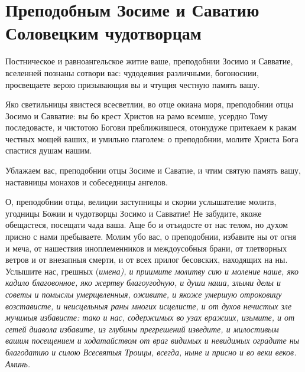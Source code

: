 \section{Преподобным Зосиме и Саватию Соловецким чудотворцам}\begin{mymulticols}
 


Постническое и равноангельское житие ваше, преподобнии Зосимо и Савватие, вселенней познаны сотвори вас: чудодеяния различными, богоноснии, просвещаете верою призывающия вы и чтущия честную память вашу.


Яко светильницы явистеся всесветлии, во отце окиана моря, преподобнии отцы Зосимо и Савватие: вы бо крест Христов на рамо всемше, усердно Тому последовасте, и чистотою Богови преближившеся, отонудуже притекаем к ракам честных мощей ваших, и умильно глаголем: о преподобнии, молите Христа Бога спастися душам нашим.


Ублажаем вас, преподобнии отцы Зосиме и Саватие, и чтим святую память вашу, наставницы монахов и собеседницы ангелов.


О, преподобнии отцы, велиции заступницы и скории услышателие молитв, угодницы Божии и чудотворцы Зосимо и Савватие! Не забудите, якоже обещастеся, посещати чада ваша. Аще бо и отъидосте от нас телом, но духом присно с нами пребываете. Молим убо вас, о преподобнии, избавите ны от огня и меча, от нашествия иноплеменников и междоусобныя брани, от тлетворных ветров и от внезапныя смерти, и от всех прилог бесовских, находящих на ны. Услышите нас, грешных (\itshape имена\normalfont{}), и приимите молитву сию и моление наше, яко кадило благовонное, яко жертву благоугодную, и души наша, злыми делы и советы и помыслы умерщвленныя, оживите, и якоже умершую отроковицу возстависте, и неисцельныя раны многих исцелисте, и от духов нечистых зле мучимыя избависте: тако и нас, содержимых во узах вражиих, изьмите, и от сетей диавола избавите, из глубины прегрешений изведите, и милостивым вашим посещением и ходатайством от враг видимых и невидимых оградите ны благодатию и силою Всесвятыя Троицы, всегда, ныне и присно и во веки веков. Аминь.

\end{mymulticols}

